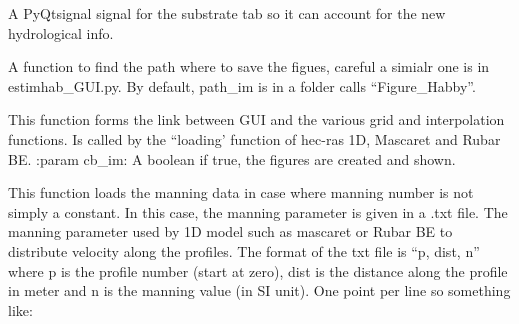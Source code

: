 \documentclass[letterpaper,10pt,english]{sphinxmanual}
\begin{document}
\begin{fulllineitems}
\begin{fulllineitems}
\end{fulllineitems}


\begin{fulllineitems}
\label{\detokenize{index:src_GUI.hydro_GUI_2.SubHydroW.drop_hydro}}
A PyQtsignal signal for the substrate tab so it can account for the new hydrological info.

\end{fulllineitems}


\begin{fulllineitems}
\label{\detokenize{index:src_GUI.hydro_GUI_2.SubHydroW.find_path_im}}
A function to find the path where to save the figues, careful a simialr one is in estimhab\_GUI.py. By default,
path\_im is in a folder calls ``Figure\_Habby''.

\end{fulllineitems}


\begin{fulllineitems}
\label{\detokenize{index:src_GUI.hydro_GUI_2.SubHydroW.grid_and_interpo}}
This function forms the link between GUI and the various grid and interpolation functions. Is called by
the ``loading' function of hec-ras 1D, Mascaret and Rubar BE.
:param cb\_im: A boolean if true, the figures are created and shown.


\end{fulllineitems}


\begin{fulllineitems}
\label{\detokenize{index:src_GUI.hydro_GUI_2.SubHydroW.load_manning_text}}
This function loads the manning data in case where manning number is not simply a constant. In this case, the manning
parameter is given in a .txt file.
The manning parameter used by 1D model such as mascaret or Rubar BE to distribute velocity along the profiles.
The format of the txt file is ``p, dist, n'' where  p is the profile number (start at zero), dist is the distance
along the profile in meter and n is the manning value (in SI unit). One point per line so something like:


\end{fulllineitems}
\end{fulllineitems}
\end{document}

